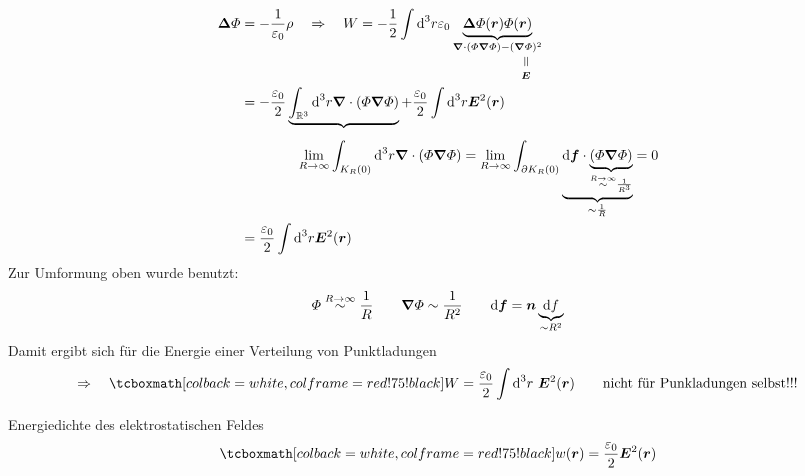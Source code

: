 \begin{align*}
\vec\Delta \Phi &= - \frac{1}{\epsilon_0} \rho \quad \Rightarrow \quad W = -\frac{1}{2} \int \dd^3r \epsilon_0 \ub{\vec\Delta \Phi(\vec{r}) \Phi(\vec{r})}_{\vec{\nabla} \cdot (\Phi \vec{\nabla} \Phi) - \equalto{(\vec{\nabla} \Phi)^2}{\vec{E}} }\\
&= -\frac{\epsilon_0}{2} \ub{\int_{\mathbb{R}^3} \dd^3r \vec{\nabla} \cdot (\Phi \vec{\nabla} \Phi)} + \frac{\epsilon_0}{2} \int \dd^3r \vec{E}^2(\vec{r})\\[5pt]
& \qquad \qquad \lim\limits_{R\to \infty} \int_{K_R(0)} \dd^3r \vec{\nabla} \cdot (\Phi \vec{\nabla} \Phi) = \lim\limits_{R \to \infty} \int_{\partial K_R(0)} \ub{\dd\vec{f} \cdot \ub{(\Phi \vec{\nabla}\Phi)}_{\buildrel {R\to \infty} \over \sim \frac{1}{R^3}}}_{\sim \frac{1}{R}} = 0\\
&= \frac{\epsilon_0}{2} \int \dd^3r \vec{E}^2(\vec{r})
\end{align*}
Zur Umformung oben wurde benutzt:
\begin{equation*}
\Phi \buildrel R\to \infty \over \sim \frac{1}{R} \qquad \vec{\nabla} \Phi \sim \frac{1}{R^2}\qquad \dd\vec{f} = \vec{n} \ub{\dd f}_{\sim R^2}
\end{equation*}
Damit ergibt sich für die Energie einer Verteilung von Punktladungen 
$$\Rightarrow \quad \rmbox{W = \frac{\epsilon_0}{2} \int \dd^3 r\ \vec{E}^2(\vec{r})} \qquad \textrm{nicht für Punkladungen selbst!!!}$$
\begin{minipage}{.6\linewidth}
	Energiedichte des elektrostatischen Feldes
	$$\rmbox{w(\vec{r}) = \frac{\epsilon_0}{2} \vec{E}^2(\vec{r})}$$
\end{minipage}%
\begin{minipage}{.4\linewidth}
	\flushright
\end{minipage}%

